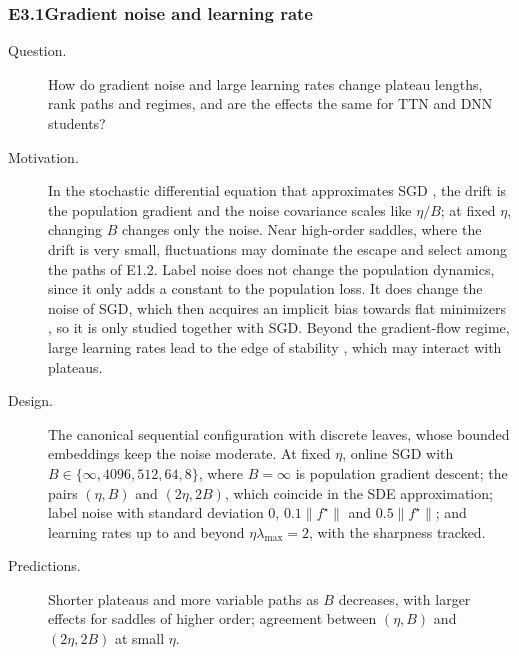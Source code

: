 \documentclass[11pt]{article}
\newcommand{\norm}[1]{\lVert #1\rVert}
\theoremstyle{definition}
\numberwithin{equation}{section}
\begin{document}
\subsubsection*{E3.1\quad Gradient noise and learning rate}
\begin{description}
\item[Question.] How do gradient noise and large learning rates change plateau lengths, rank paths and regimes, and are the effects the same for TTN and DNN students?
\item[Motivation.] In the stochastic differential equation that approximates SGD \citep{li2017stochastic}, the drift is the population gradient and the noise covariance scales like $\eta/B$; at fixed $\eta$, changing $B$ changes only the noise. Near high-order saddles, where the drift is very small, fluctuations may dominate the escape and select among the paths of E1.2. Label noise does not change the population dynamics, since it only adds a constant to the population loss. It does change the noise of SGD, which then acquires an implicit bias towards flat minimizers \citep{damian2021label}, so it is only studied together with SGD. Beyond the gradient-flow regime, large learning rates lead to the edge of stability \citep{cohen2021gradient}, which may interact with plateaus.
\item[Design.] The canonical sequential configuration with discrete leaves, whose bounded embeddings keep the noise moderate. At fixed $\eta$, online SGD with $B\in\{\infty,4096,512,64,8\}$, where $B=\infty$ is population gradient descent; the pairs $(\eta,B)$ and $(2\eta,2B)$, which coincide in the SDE approximation; label noise with standard deviation $0$, $0.1\norm{f^\star}$ and $0.5\norm{f^\star}$; and learning rates up to and beyond $\eta\lambda_{\max}=2$, with the sharpness tracked.
\item[Predictions.] Shorter plateaus and more variable paths as $B$ decreases, with larger effects for saddles of higher order; agreement between $(\eta,B)$ and $(2\eta,2B)$ at small $\eta$.
\end{description}
\end{document}

